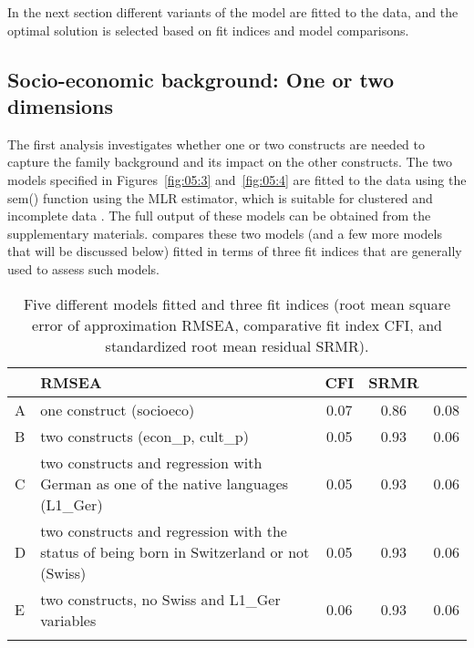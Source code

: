 \documentclass[output=paper]{langsci/langscibook}
\begin{document}
In the next section different variants of the model are fitted to the data, and the optimal solution is selected based on fit indices and model comparisons.

\subsection{Socio-economic background: One or two dimensions}

The first analysis investigates whether one or two constructs are needed to capture the family background and its impact on the other constructs. The two models specified in Figures~\ref{fig:05:3} and~\ref{fig:05:4} are fitted to the data using the sem() function using the MLR estimator, which is suitable for clustered and incomplete data \citep{Rosseel2012}. The full output of these models can be obtained from the supplementary materials.  compares these two models (and a few more models that will be discussed below) fitted in terms of three fit indices that are generally used to assess such models.

\begin{table}
\caption{Five different models fitted and three fit indices (root mean square error of approximation RMSEA, comparative fit index CFI, and standardized root mean residual SRMR).\label{tab:05:2}}
\begin{tabularx}{\textwidth}{lQ ccc}
\lsptoprule
{} & {RMSEA} & {CFI} & {SRMR}\\\midrule
A & one construct (socioeco) & 0.07 & 0.86 & 0.08\\
B & two constructs (econ\_p, cult\_p) & 0.05 & 0.93 & 0.06\\
C & two constructs and regression with German as one of the native languages (L1\_Ger) & 0.05 & 0.93 & 0.06\\
D & two constructs and regression with the status of being born in Switzerland or not (Swiss) & 0.05 & 0.93 & 0.06\\
E & two constructs, no Swiss and L1\_Ger variables & 0.06 & 0.93 & 0.06\\
\lspbottomrule
\end{tabularx}
\end{table}
\end{document}
